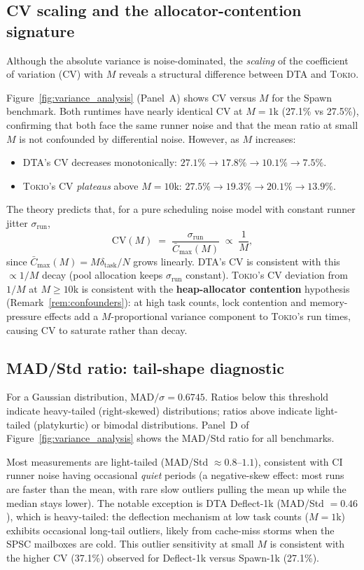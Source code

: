 \documentclass[11pt,a4paper]{article}
\newcommand{\dtact}{\textsc{DTA}}
\newcommand{\tokio}{\textsc{Tokio}}
\begin{document}
\subsection{CV scaling and the allocator-contention signature}

Although the absolute variance is noise-dominated, the \emph{scaling} of
the coefficient of variation (CV) with $M$ reveals a structural difference
between \dtact{} and \tokio{}.

Figure~\ref{fig:variance_analysis} (Panel~A) shows CV versus $M$ for the
Spawn benchmark.  Both runtimes have nearly identical CV at $M=1$k
(27.1\% vs 27.5\%), confirming that both face the same runner noise and
that the mean ratio at small $M$ is not confounded by differential noise.
However, as $M$ increases:
\begin{itemize}
  \item \dtact{}'s CV decreases monotonically: $27.1\% \to 17.8\% \to 10.1\% \to 7.5\%$.
  \item \tokio{}'s CV \emph{plateaus} above $M = 10$k: $27.5\% \to 19.3\% \to 20.1\% \to 13.9\%$.
\end{itemize}
The theory predicts that, for a pure scheduling noise model with constant
runner jitter $\sigma_{\mathrm{run}}$,
\[
  \mathrm{CV}(M) \;=\; \frac{\sigma_{\mathrm{run}}}{\bar{C}_{\max}(M)}
  \;\propto\; \frac{1}{M},
\]
since $\bar{C}_{\max}(M) = M\delta_{\mathrm{task}}/N$ grows linearly.
\dtact{}'s CV is consistent with this $\propto 1/M$ decay (pool allocation
keeps $\sigma_{\mathrm{run}}$ constant).  \tokio{}'s CV deviation from
$1/M$ at $M \geq 10$k is consistent with the \textbf{heap-allocator
contention} hypothesis (Remark~\ref{rem:confounders}): at high task counts,
lock contention and memory-pressure effects add a $M$-proportional variance
component to \tokio{}'s run times, causing CV to saturate rather than decay.

\subsection{MAD/Std ratio: tail-shape diagnostic}

For a Gaussian distribution, $\mathrm{MAD}/\sigma = 0.6745$.
Ratios below this threshold indicate heavy-tailed (right-skewed) distributions;
ratios above indicate light-tailed (platykurtic) or bimodal distributions.
Panel~D of Figure~\ref{fig:variance_analysis} shows the MAD/Std ratio for
all benchmarks.

Most measurements are light-tailed (MAD/Std $\approx 0.8$--$1.1$), consistent
with CI runner noise having occasional \emph{quiet} periods (a negative-skew
effect: most runs are faster than the mean, with rare slow outliers pulling
the mean up while the median stays lower).  The notable exception is
\dtact{} Deflect-1k (MAD/Std $= 0.46$), which is heavy-tailed: the deflection
mechanism at low task counts ($M = 1$k) exhibits occasional long-tail
outliers, likely from cache-miss storms when the SPSC mailboxes are cold.
This outlier sensitivity at small $M$ is consistent with the higher CV
(37.1\%) observed for Deflect-1k versus Spawn-1k (27.1\%).
\end{document}
